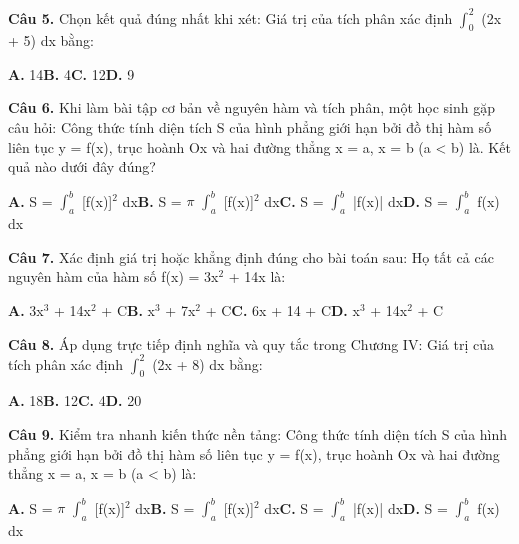 \documentclass[11pt,a4paper]{article}
\begin{document}
\textbf{\color{primary} Câu 5.} Chọn kết quả đúng nhất khi xét: Giá trị của tích phân xác định $\int_{0}^{2}$ (2x + 5) dx bằng:\par
\hspace*{1.5em}\textbf{A.} 14\quad\quad \textbf{B.} 4\quad\quad \textbf{C.} 12\quad\quad \textbf{D.} 9\par\vspace{2pt}
\textbf{\color{primary} Câu 6.} Khi làm bài tập cơ bản về nguyên hàm và tích phân, một học sinh gặp câu hỏi: Công thức tính diện tích S của hình phẳng giới hạn bởi đồ thị hàm số liên tục y = f(x), trục hoành Ox và hai đường thẳng x = a, x = b (a < b) là. Kết quả nào dưới đây đúng?\par
\hspace*{1.5em}\textbf{A.} S = $\int_{a}^{b}$ [f(x)]$^2$ dx\quad\quad \textbf{B.} S = $\pi$ $\int_{a}^{b}$ [f(x)]$^2$ dx\quad\quad \textbf{C.} S = $\int_{a}^{b}$ |f(x)| dx\quad\quad \textbf{D.} S = $\int_{a}^{b}$ f(x) dx\par\vspace{2pt}
\textbf{\color{primary} Câu 7.} Xác định giá trị hoặc khẳng định đúng cho bài toán sau: Họ tất cả các nguyên hàm của hàm số f(x) = 3x$^2$ + 14x là:\par
\hspace*{1.5em}\textbf{A.} 3x$^3$ + 14x$^2$ + C\quad\quad \textbf{B.} x$^3$ + 7x$^2$ + C\quad\quad \textbf{C.} 6x + 14 + C\quad\quad \textbf{D.} x$^3$ + 14x$^2$ + C\par\vspace{2pt}
\textbf{\color{primary} Câu 8.} Áp dụng trực tiếp định nghĩa và quy tắc trong Chương IV: Giá trị của tích phân xác định $\int_{0}^{2}$ (2x + 8) dx bằng:\par
\hspace*{1.5em}\textbf{A.} 18\quad\quad \textbf{B.} 12\quad\quad \textbf{C.} 4\quad\quad \textbf{D.} 20\par\vspace{2pt}
\textbf{\color{primary} Câu 9.} Kiểm tra nhanh kiến thức nền tảng: Công thức tính diện tích S của hình phẳng giới hạn bởi đồ thị hàm số liên tục y = f(x), trục hoành Ox và hai đường thẳng x = a, x = b (a < b) là:\par
\hspace*{1.5em}\textbf{A.} S = $\pi$ $\int_{a}^{b}$ [f(x)]$^2$ dx\quad\quad \textbf{B.} S = $\int_{a}^{b}$ [f(x)]$^2$ dx\quad\quad \textbf{C.} S = $\int_{a}^{b}$ |f(x)| dx\quad\quad \textbf{D.} S = $\int_{a}^{b}$ f(x) dx\par\vspace{2pt}
\end{document}
